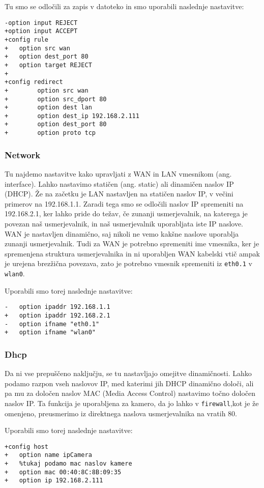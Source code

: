 \documentclass[a4paper, 12pt]{book}
\begin{document}
Tu smo se odločili za zapis v datoteko in smo uporabili naslednje nastavitve:
\begin{lstlisting}[caption=/etc/config/firewall]
-option input REJECT
+option input ACCEPT
+config rule
+	option src wan
+	option dest_port 80
+	option target REJECT
+    
+config redirect
+        option src wan
+        option src_dport 80
+        option dest lan
+        option dest_ip 192.168.2.111
+        option dest_port 80
+        option proto tcp
\end{lstlisting}
\subsubsection{Network}
Tu najdemo nastavitve kako upravljati z WAN in LAN vmesnikom (ang. interface). Lahko nastavimo statičen (ang. static) ali dinamičen naslov IP (DHCP). Že na začetku je LAN nastavljen na statičen naslov IP, v večini primerov na 192.168.1.1. Zaradi tega smo se odločili naslov IP spremeniti na 192.168.2.1, ker lahko pride do težav, če zunanji usmerjevalnik, na katerega je povezan naš usmerjevalnik, in naš usmerjevalnik uporabljata iste IP naslove. WAN je nastavljen dinamično, saj nikoli ne vemo kakšne naslove uporablja zunanji usmerjevalnik. Tudi za WAN je potrebno spremeniti ime vmesnika, ker je spremenjena struktura usmerjevalnika in ni uporabljen WAN kabelski vtič ampak je urejena brezžična povezava, zato je potrebno vmesnik spremeniti iz {\tt eth0.1} v {\tt wlan0}.

Uporabili smo torej naslednje nastavitve:
\begin{lstlisting}[caption=/etc/config/network]
-	option ipaddr 192.168.1.1
+	option ipaddr 192.168.2.1
-	option ifname "eth0.1"
+	option ifname "wlan0"
\end{lstlisting}
\subsubsection{Dhcp}
Da ni vse prepuščeno naključju, se tu nastavljajo omejitve dinamičnosti. Lahko podamo razpon vseh naslovov IP, med katerimi jih DHCP dinamično določi, ali pa mu za določen naslov MAC (Media Access Control)  nastavimo točno določen naslov IP. Ta funkcija je uporabljena za kamero, da jo lahko v {\tt firewall},kot je že omenjeno, preusmerimo iz direktnega naslova usmerjevalnika na vratih 80.

Uporabili smo torej naslednje nastavitve:
\begin{lstlisting}[caption=/etc/config/dhcp]
+config host
+	option name ipCamera
+	%tukaj podamo mac naslov kamere
+	option mac 00:40:8C:8B:09:35
+	option ip 192.168.2.111
\end{lstlisting}
\end{document}
